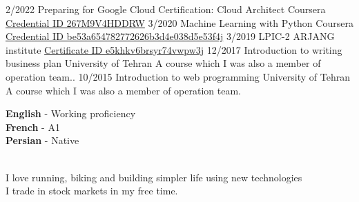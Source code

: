 \documentclass[9pt]{developercv}
\begin{document}
\begin{entrylist}
	\entry
	{2/2022}
	{Preparing for Google Cloud Certification: Cloud Architect}
	{Coursera}
	{{\href{https://www.coursera.org/account/accomplishments/professional-cert/267M9V4HDDRW}{Credential ID 267M9V4HDDRW}}}
	\entry
	{3/2020}
	{Machine Learning with Python}
	{Coursera}
	{{\href{https://www.coursera.org/account/accomplishments/records/8KNW27XHXTVF?utm_medium=Certificate}{Credential ID be53a654782772626b3d4e038d5e53f4j}}}
	\entry
	{3/2019}
	{LPIC-2}
	{ARJANG institute}
	{{\href{http://gotoclass.ir/Certificates/e5khkv6brsyr74vwpw3j/}{Certificate ID e5khkv6brsyr74vwpw3j}}}
	\entry
	{12/2017}
	{Introduction to writing business plan}
	{University of Tehran}
	{A course which I was also a member of operation team.}.
	\entry
	{10/2015}
	{Introduction to web programming}
	{University of Tehran}
	{A course which I was also a member of operation team.}

\end{entrylist}


\begin{minipage}[t]{0.45\textwidth}
	\vspace{-\baselineskip} %


	\textbf{English} - Working proficiency\\
	\textbf{French} - A1\\
	\textbf{Persian} - Native\\\
\end{minipage}
\hfill
\begin{minipage}[t]{0.45\textwidth}
	\vspace{-\baselineskip} %


	I love running, biking and building simpler life using new technologies\\
	I trade in stock markets in my free time.
\end{minipage}
\end{document}
